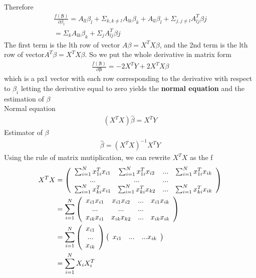 \documentclass[a4paper]{article}
\begin{document}
Therefore
\begin{align*}
\frac{f(\boldsymbol \beta)}{\partial \beta_l}  = A_{ll} \beta_l + \Sigma_{k, k\neq l} A_{lk}\beta_{k} + A_{ll} \beta_l + \Sigma_{j, j \neq l} A^T_{lj}\beta{j} \\
= \Sigma_{k} A_{lk}\beta_{k} + \Sigma_{j} A^T_{lj}\beta{j}
\end{align*}
The first term is the lth row of vector $A\beta = X^TX\beta$, and the 2nd term is the lth row of vector$A^T\beta=X^TX\beta$. So we put the whole derivative in matrix form
\begin{align*}
\frac{f(\boldsymbol \beta)}{\partial {\boldsymbol \beta}} = -2X^TY+2X^TX\beta
\end{align*}
which is a px1 vector with each row corresponding to the derivative with respect to $\beta_i$
letting the derivative equal to zero yields the {\bf normal equation} and the estimation of $\beta$\\
Normal equation
\begin{align*}
(X^TX) \hat \beta = X^TY
\end{align*}
Estimator of $\beta$
\begin{align*}
\hat \beta = (X^TX)^{-1}X^TY
\end{align*}
Using the rule of matrix mutiplication, we can rewrite $X^TX$ as the f
\begin{align*}
X^TX & =
 \left( \begin{array} { c  c  c c } 
                   \sum_{i=1}^N x_{1i}^Tx_{i1} &  \sum_{i=1}^Nx_{1i}^Tx_{i2} & ... & \sum_{i=1}^N x^T_{1i}x_{ik}   \\
                   ... & ... & ... & \\
                   \sum_{i=1}^N x_{ki}^Tx_{i1} &  \sum_{i=1}^Nx_{ki}^Tx_{k2} & ... & \sum_{i=1}^Nx^T_{ki}x_{ik}   \\
           \end{array} \right) \\
    & =  \sum_{i=1}^N
 \left( \begin{array} { c  c  c c } 
                   x_{i1}x_{i1} & x_{i1}x_{i2} & ... & x_{i1}x_{ik}   \\
                   ... & ... & ... & \\
                   x_{ik}x_{i1} & x_{ik}x_{k2} & ... & x_{ik}x_{ik}   \\
           \end{array} \right) \\
      &  =  \sum_{i=1}^N
 \left( \begin{array} { c  } 
                   x_{i1}    \\
                   ...  \\
                   x_{ik}    \\
           \end{array} \right)
 \left( \begin{array} { c c c c } 
                   x_{i1}  & ... &  ... x_{ik}\\ 
           \end{array} \right) \\
     & = \sum_{i=1}^N X_i X_i^T
\end{align*}
\end{document}
